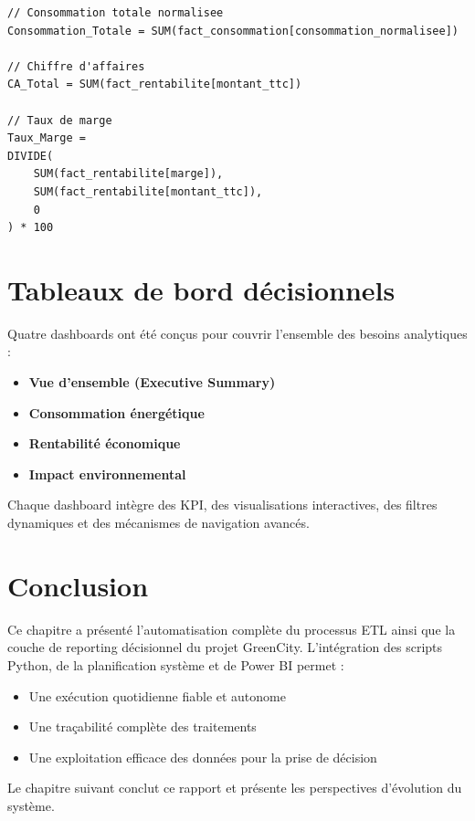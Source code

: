 \documentclass[12pt,a4paper]{report}
\begin{document}
\begin{lstlisting}[caption=Exemples de mesures DAX]
// Consommation totale normalisee
Consommation_Totale = SUM(fact_consommation[consommation_normalisee])

// Chiffre d'affaires
CA_Total = SUM(fact_rentabilite[montant_ttc])

// Taux de marge
Taux_Marge =
DIVIDE(
    SUM(fact_rentabilite[marge]),
    SUM(fact_rentabilite[montant_ttc]),
    0
) * 100
\end{lstlisting}

\section{Tableaux de bord décisionnels}

Quatre dashboards ont été conçus pour couvrir l’ensemble des besoins analytiques :

\begin{itemize}
    \item \textbf{Vue d’ensemble (Executive Summary)}
    \item \textbf{Consommation énergétique}
    \item \textbf{Rentabilité économique}
    \item \textbf{Impact environnemental}
\end{itemize}

Chaque dashboard intègre des KPI, des visualisations interactives, des filtres dynamiques et des mécanismes de navigation avancés.

\section{Conclusion}

Ce chapitre a présenté l’automatisation complète du processus ETL ainsi que la couche de reporting décisionnel du projet GreenCity.  
L’intégration des scripts Python, de la planification système et de Power BI permet :

\begin{itemize}
    \item Une exécution quotidienne fiable et autonome
    \item Une traçabilité complète des traitements
    \item Une exploitation efficace des données pour la prise de décision
\end{itemize}

Le chapitre suivant conclut ce rapport et présente les perspectives d’évolution du système.
\end{document}
